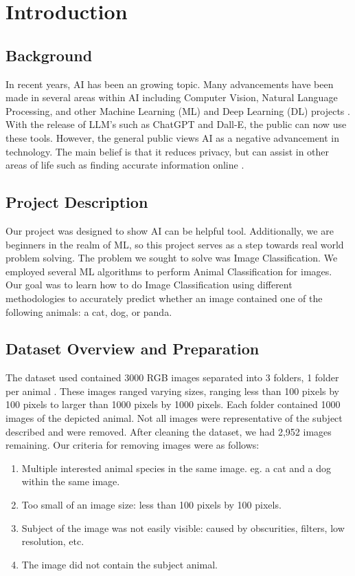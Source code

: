 \section{Introduction}

\subsection{Background}
In recent years, AI has been an growing topic. 
Many advancements have been made in several areas within AI including Computer Vision, Natural Language Processing, and other Machine Learning (ML) and Deep Learning (DL) projects \cite{AIAdv}.
With the release of LLM's such as ChatGPT and Dall-E, the public can now use these tools. 
However, the general public views AI as a negative advancement in technology. 
The main belief is that it reduces privacy, but can assist in other areas of life such as finding accurate information online
\cite{publicOpinion}.


\subsection{Project Description}
Our project was designed to show AI can be helpful tool.
Additionally, we are beginners in the realm of ML, so this project serves as a step towards real world problem solving.
The problem we sought to solve was Image Classification.
We employed several ML algorithms to perform Animal Classification for images.
Our goal was to learn how to do Image Classification using different methodologies to accurately predict whether an image contained one of the following animals: a cat, dog, or panda.

\subsection{Dataset Overview and Preparation}
The dataset used contained 3000 RGB images separated into 3 folders, 1 folder per animal \cite{Dataset}.
These images ranged varying sizes, ranging less than 100 pixels by 100 pixels to larger than 1000 pixels by 1000 pixels.
Each folder contained 1000 images of the depicted animal.
Not all images were representative of the subject described and were removed.
After cleaning the dataset, we had 2,952 images remaining.
Our criteria for removing images were as follows:

\begin{enumerate}
    \item Multiple interested animal species in the same image. eg. a cat and a dog within the same image.
    \item Too small of an image size: less than 100 pixels by 100 pixels.
    \item Subject of the image was not easily visible: caused by obscurities, filters, low resolution, etc.
    \item The image did not contain the subject animal.
\end{enumerate}

